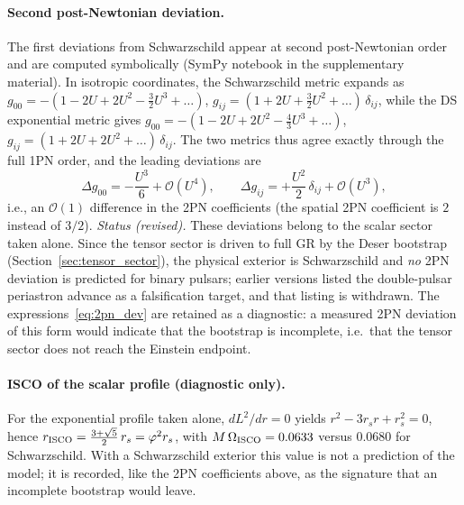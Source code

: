 \documentclass[11pt,a4paper]{article}
\theoremstyle{plain}
\theoremstyle{remark}
\begin{document}
\paragraph{Second post-Newtonian deviation.} The first deviations from Schwarzschild appear at second post-Newtonian order and are computed symbolically (SymPy notebook in the supplementary material). In isotropic coordinates, the Schwarzschild metric expands as $g_{00} = -(1 - 2U + 2U^2 - \tfrac{3}{2}U^3 + \ldots)$, $g_{ij} = (1 + 2U + \tfrac{3}{2}U^2 + \ldots)\,\delta_{ij}$, while the DS exponential metric gives $g_{00} = -(1 - 2U + 2U^2 - \tfrac{4}{3}U^3 + \ldots)$, $g_{ij} = (1 + 2U + 2U^2 + \ldots)\,\delta_{ij}$. The two metrics thus agree exactly through the full 1PN order, and the leading deviations are
\begin{equation}\label{eq:2pn_dev}
\Delta g_{00} = -\frac{U^3}{6} + \mathcal{O}(U^4), \qquad
\Delta g_{ij} = +\frac{U^2}{2}\,\delta_{ij} + \mathcal{O}(U^3),
\end{equation}
i.e., an $\mathcal{O}(1)$ difference in the 2PN coefficients (the spatial 2PN coefficient is $2$ instead of $3/2$). \emph{Status (revised).} These deviations belong to the scalar sector taken alone. Since the tensor sector is driven to full GR by the Deser bootstrap (Section~\ref{sec:tensor_sector}), the physical exterior is Schwarzschild and \emph{no} 2PN deviation is predicted for binary pulsars; earlier versions listed the double-pulsar periastron advance as a falsification target, and that listing is withdrawn. The expressions~\eqref{eq:2pn_dev} are retained as a diagnostic: a measured 2PN deviation of this form would indicate that the bootstrap is incomplete, i.e.\ that the tensor sector does not reach the Einstein endpoint.

\paragraph{ISCO of the scalar profile (diagnostic only).} For the exponential profile taken alone, $dL^2/dr = 0$ yields $r^2 - 3r_s r + r_s^2 = 0$, hence $r_{\rm ISCO} = \tfrac{3+\sqrt{5}}{2}\,r_s = \varphi^{2} r_s$, with $M\,\Omega_{\rm ISCO} = 0.0633$ versus $0.0680$ for Schwarzschild. With a Schwarzschild exterior this value is not a prediction of the model; it is recorded, like the 2PN coefficients above, as the signature that an incomplete bootstrap would leave.
\end{document}
